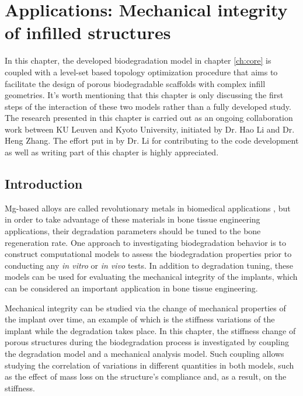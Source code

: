 \chapter{Applications: Mechanical integrity of infilled structures}\label{ch:infill}

In this chapter, the developed biodegradation model in chapter \ref{ch:core} is coupled with a level-set based topology optimization procedure that aims to facilitate the design of porous biodegradable scaffolds with complex infill geometries. It's worth mentioning that this chapter is only discussing the first steps of the interaction of these two models rather than a fully developed study. The research presented in this chapter is carried out as an ongoing collaboration work between KU Leuven and Kyoto University, initiated by Dr. Hao Li and Dr. Heng Zhang. The effort put in by Dr. Li for contributing to the code development as well as writing part of this chapter is highly appreciated.

\section{Introduction}

Mg-based alloys are called revolutionary metals in biomedical applications \cite{Shuai2019}, but in order to take advantage of these materials in bone tissue engineering applications, their degradation parameters should be tuned to the bone regeneration rate. One approach to investigating biodegradation behavior is to construct computational models to assess the biodegradation properties prior to conducting any \textit{in vitro} or \textit{in vivo} tests. In addition to degradation tuning, these models can be used for evaluating the mechanical integrity of the implants, which can be considered an important application in bone tissue engineering. 

Mechanical integrity can be studied via the change of mechanical properties of the implant over time, an example of which is the stiffness variations of the implant while the degradation takes place. In this chapter, the stiffness change of porous structures during the biodegradation process is investigated by coupling the degradation model and a mechanical analysis model. Such coupling allows studying the correlation of variations in different quantities in both models, such as the effect of mass loss on the structure's compliance and, as a result, on the stiffness. 


